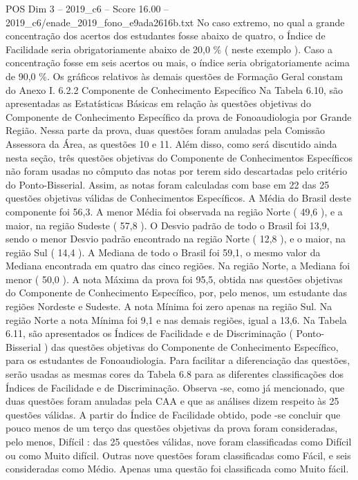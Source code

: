 \begin{textsample}{POS Dim 3 – 2019\_c6 – Score 16.00 – 2019\_c6/enade\_2019\_fono\_e9ada2616b.txt}
No caso extremo, no qual a grande concentração dos acertos dos estudantes fosse abaixo de quatro, o Índice de Facilidade seria obrigatoriamente abaixo de 20,0 \% ( neste exemplo ).
Caso a concentração fosse em seis acertos ou mais, o índice seria obrigatoriamente acima de 90,0 \%.
Os gráficos relativos às demais questões de Formação Geral constam do Anexo I. 6.2.2 Componente de Conhecimento Específico Na Tabela 6.10, são apresentadas as Estatísticas Básicas em relação às questões objetivas do Componente de Conhecimento Específico da prova de Fonoaudiologia por Grande Região.
Nessa parte da prova, duas questões foram anuladas pela Comissão Assessora da Área, as questões 10 e 11.
Além disso, como será discutido ainda nesta seção, três questões objetivas do Componente de Conhecimentos Específicos não foram usadas no cômputo das notas por terem sido descartadas pelo critério do Ponto-Bisserial.
Assim, as notas foram calculadas com base em 22 das 25 questões objetivas válidas de Conhecimentos Específicos.
A Média do Brasil deste componente foi 56,3.
A menor Média foi observada na região Norte ( 49,6 ), e a maior, na região Sudeste ( 57,8 ).
O Desvio padrão de todo o Brasil foi 13,9, sendo o menor Desvio padrão encontrado na região Norte ( 12,8 ), e o maior, na região Sul ( 14,4 ).
A Mediana de todo o Brasil foi 59,1, o mesmo valor da Mediana encontrada em quatro das cinco regiões.
Na região Norte, a Mediana foi menor ( 50,0 ).
A nota Máxima da prova foi 95,5, obtida nas questões objetivas do Componente de Conhecimento Específico, por, pelo menos, um estudante das regiões Nordeste e Sudeste.
A nota Mínima foi zero apenas na região Sul.
Na região Norte a nota Mínima foi 9,1 e nas demais regiões, igual a 13,6.
Na Tabela 6.11, são apresentados os Índices de Facilidade e de Discriminação ( Ponto-Bisserial ) das questões objetivas do Componente de Conhecimento Específico, para os estudantes de Fonoaudiologia.
Para facilitar a diferenciação das questões, serão usadas as mesmas cores da Tabela 6.8 para as diferentes classificações dos Índices de Facilidade e de Discriminação.
Observa -se, como já mencionado, que duas questões foram anuladas pela CAA e que as análises dizem respeito às 25 questões válidas.
A partir do Índice de Facilidade obtido, pode -se concluir que pouco menos de um terço das questões objetivas da prova foram consideradas, pelo menos, Difícil : das 25 questões válidas, nove foram classificadas como Difícil ou como Muito difícil.
Outras nove questões foram classificadas como Fácil, e seis consideradas como Médio.
Apenas uma questão foi classificada como Muito fácil.

\end{textsample}
